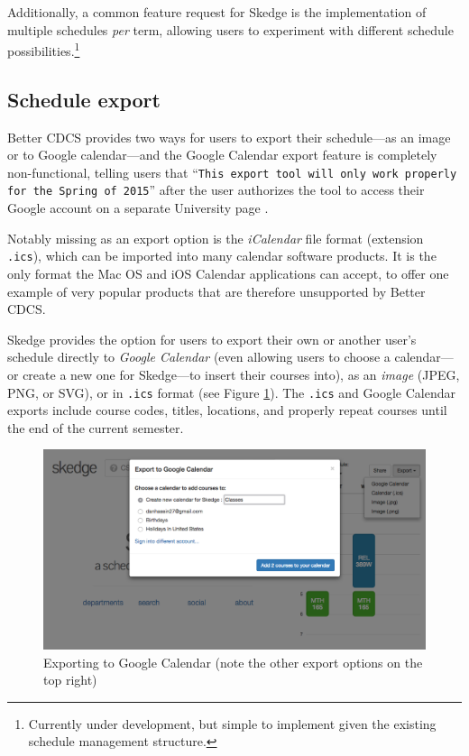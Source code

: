 Additionally, a common feature request for Skedge is the implementation of multiple schedules \emph{per} term, allowing users to experiment with different schedule possibilities.\footnote{Currently under development, but simple to implement given the existing schedule management structure.}

\subsection{Schedule export}

Better CDCS provides two ways for users to export their schedule---as an image or to Google calendar---and the Google Calendar export feature is completely non-functional, telling users that ``{\tt This export tool will only work properly for the Spring of 2015}'' after the user authorizes the tool to access their Google account on a separate University page \cite{cdcs-google}.

Notably missing as an export option is the \emph{iCalendar} file format (extension {\tt .ics}), which can be imported into many calendar software products. It is the only format the Mac OS and iOS Calendar applications can accept, to offer one example of very popular products that are therefore unsupported by Better CDCS.

Skedge provides the option for users to export their own or another user's schedule directly to \emph{Google Calendar} (even allowing users to choose a calendar---or create a new one for Skedge---to insert their courses into), as an \emph{image} (JPEG, PNG, or SVG), or in {\tt .ics} format (see Figure \ref{fig:sk-export}). The {\tt .ics} and Google Calendar exports include course codes, titles, locations, and properly repeat courses until the end of the current semester.

\vspace{20pt}

\begin{figure}[ht]
  \centering
  \vspace{2pt}
  \includegraphics[width=14cm]{images/skedge/export}
  \caption[Skedge exporting options]{Exporting to Google Calendar (note the other export options on the top right)} \label{fig:sk-export}
\end{figure}

\clearpage